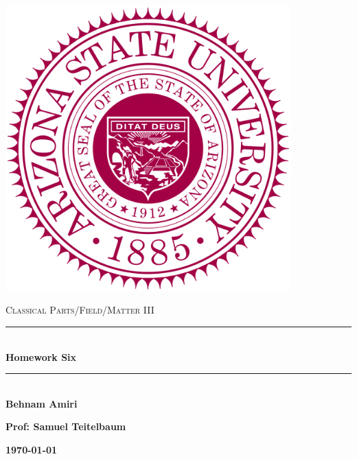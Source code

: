 \documentclass[fleqn]{article}
\begin{document}
  \begin{titlepage}

    \newcommand{\HRule}{\rule{\linewidth}{0.5mm}}

    \center

    \begin{center}
      \includegraphics[height=11cm, width=11cm]{asu.png}
    \end{center}

    \vline

    \textsc{\LARGE Classical Parts/Field/Matter III}\\[1.5cm]

    \HRule \\[0.5cm]
    { \huge \bfseries Homework Six}\\[0.4cm] 
    \HRule \\[1.0cm]

    \textbf{Behnam Amiri}

    \bigbreak

    \textbf{Prof: Samuel Teitelbaum}

    \bigbreak

    \textbf{{\large \today}\\[2cm]}

    \vfill

  \end{titlepage}
\end{document}
